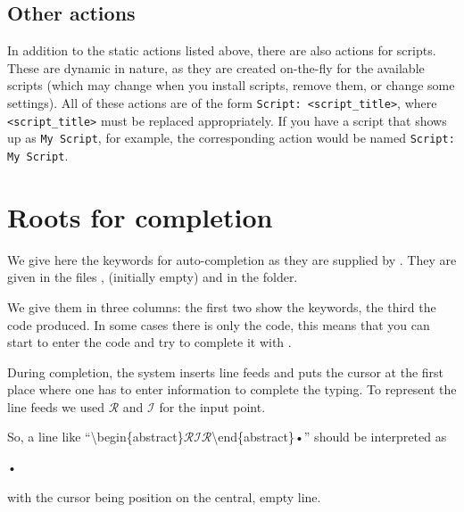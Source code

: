 \subsection{Other actions}
In addition to the static actions listed above, there are also actions for scripts. These are dynamic in nature, as they are created on-the-fly for the available scripts (which may change when you install scripts, remove them, or change some settings). All of these actions are of the form \verb*|Script: <script_title>|, where \verb*|<script_title>| must be replaced appropriately. If you have a script that shows up as \verb|My Script|, for example, the corresponding action would be named \verb*|Script: My Script|.


\section{Roots for completion}
\label{sec.autocompletion}

We give here the keywords for auto-completion as they are supplied by {\Tw}. They are given in the files ,  (initially empty) and  in the  folder.

We give them in three columns: the first two show the keywords, the third the {\AllTeX} code produced. In some cases there is only the code, this means that you can start to enter the {\AllTeX} code and try to complete it with .

\newcommand{\AutoCompRet}{$\mathcal{R}$}
\newcommand{\AutoCompIns}{$\mathcal{I}$}
During completion, the system inserts line feeds and puts the cursor at the first place where one has to enter information to complete the typing. To represent the line feeds we used {\AutoCompRet} and {\AutoCompIns} for the input point. 

So, a line like ``\textbackslash begin\{abstract\}{\AutoCompRet}{\AutoCompIns}{\AutoCompRet}\textbackslash end\{abstract\}•'' should be interpreted as
\begin{verbExample}
\begin{abstract}

\end{abstract}•
\end{verbExample}
with the cursor being position on the central, empty line.

